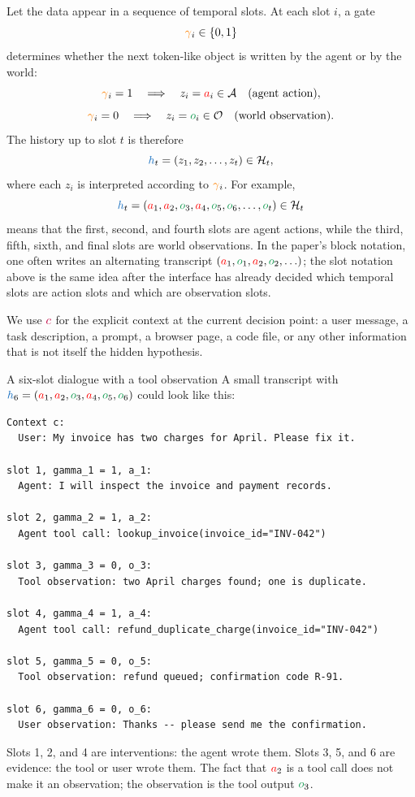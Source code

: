 \documentclass[11pt]{article}
\newcommand{\ActionSet}{\mathcal{A}}
\newcommand{\ObsSet}{\mathcal{O}}
\newcommand{\History}{\mathcal{H}}
\newcommand{\action}{\ensuremath{\textcolor{red}{a}}}
\newcommand{\obs}{\ensuremath{\textcolor{ForestGreen}{o}}}
\newcommand{\contextsym}{\ensuremath{\textcolor{purple}{c}}}
\newcommand{\gate}{\ensuremath{\textcolor{orange}{\gamma}}}
\newcommand{\history}{\ensuremath{\textcolor{RoyalBlue}{h}}}
\newcommand{\token}{\ensuremath{z}}
\begin{document}
Let the data appear in a sequence of temporal slots. At each slot $i$, a gate
\[
  \gate_i \in \{0,1\}
\]
determines whether the next token-like object is written by the agent or by the
world:
\[
  \gate_i=1 \quad \Longrightarrow \quad \token_i=\action_i\in\ActionSet
  \quad\text{(agent action)},
\]
\[
  \gate_i=0 \quad \Longrightarrow \quad \token_i=\obs_i\in\ObsSet
  \quad\text{(world observation)}.
\]
The history up to slot $t$ is therefore
\[
  \history_t=(\token_1,\token_2,\dots,\token_t)\in\History_t,
\]
where each $\token_i$ is interpreted according to $\gate_i$. For example,
\[
  \history_t=(\action_1,\action_2,\obs_3,\action_4,\obs_5,\obs_6,\dots,\obs_t)\in\History_t
\]
means that the first, second, and fourth slots are agent actions, while the
third, fifth, sixth, and final slots are world observations. In the paper's
block notation, one often writes an alternating transcript
$(\action_1,\obs_1,\action_2,\obs_2,\ldots)$; the slot notation above is the same idea after the
interface has already decided which temporal slots are action slots and which
are observation slots.

We use $\contextsym$ for the explicit context at the current decision point: a user
message, a task description, a prompt, a browser page, a code file, or any other
information that is not itself the hidden hypothesis. 

\begin{examplebox}{A six-slot dialogue with a tool observation}
A small transcript with
$\history_6=(\action_1,\action_2,\obs_3,\action_4,\obs_5,\obs_6)$ could look like this:
\begin{lstlisting}
Context c:
  User: My invoice has two charges for April. Please fix it.

slot 1, gamma_1 = 1, a_1:
  Agent: I will inspect the invoice and payment records.

slot 2, gamma_2 = 1, a_2:
  Agent tool call: lookup_invoice(invoice_id="INV-042")

slot 3, gamma_3 = 0, o_3:
  Tool observation: two April charges found; one is duplicate.

slot 4, gamma_4 = 1, a_4:
  Agent tool call: refund_duplicate_charge(invoice_id="INV-042")

slot 5, gamma_5 = 0, o_5:
  Tool observation: refund queued; confirmation code R-91.

slot 6, gamma_6 = 0, o_6:
  User observation: Thanks -- please send me the confirmation.
\end{lstlisting}
Slots 1, 2, and 4 are interventions: the agent wrote them. Slots 3, 5, and 6
are evidence: the tool or user wrote them. The fact that $\action_2$ is a tool call
does not make it an observation; the observation is the tool output $\obs_3$.
\end{examplebox}
\end{document}
